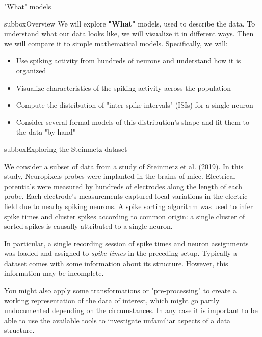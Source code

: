 \begin{textbox}{\href{https://compneuro.neuromatch.io/tutorials/W1D1_ModelTypes/student/W1D1_Tutorial1.html}{"What" models } }
\begin{subbox}{subbox}{Overview}
\scriptsize
We will explore \textbf{"What"} models, used to describe the data. To understand what our data looks like, we will visualize it in different ways. Then we will compare it to simple mathematical models. Specifically, we will:
\begin{itemize}
    \item 
Use spiking activity from hundreds of neurons and understand how it is organized
\item Visualize characteristics of the spiking activity across the population
\item Compute the distribution of "inter-spike intervals" (ISIs) for a single neuron
\item Consider several formal models of this distribution's shape and fit them to the data "by hand"
\end{itemize}

\end{subbox}

\begin{subbox}{subbox}{Exploring the Steinmetz dataset}
\scriptsize

We consider a subset of data from a study of \href{https://www.nature.com/articles/s41586-019-1787-x}{Steinmetz et al. (2019)}. In this study, Neuropixels probes were implanted in the brains of mice. Electrical potentials were measured by hundreds of electrodes along the length of each probe. Each electrode's measurements captured local variations in the electric field due to nearby spiking neurons. A spike sorting algorithm was used to infer spike times and cluster spikes according to common origin: a single cluster of sorted spikes is causally attributed to a single neuron.

In particular, a single recording session of spike times and neuron assignments was loaded and assigned to \textit{spike times} in the preceding setup.
Typically a dataset comes with some information about its structure. However, this information may be incomplete.

You might also apply some transformations or "pre-processing" to create a working representation of the data of interest, which might go partly undocumented depending on the circumstances. In any case it is important to be able to use the available tools to investigate unfamiliar aspects of a data structure.

\end{subbox}




\end{textbox}
